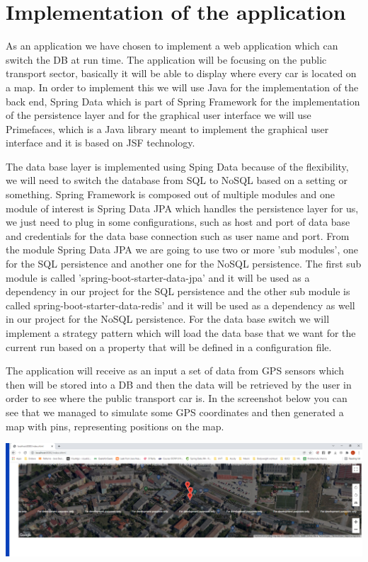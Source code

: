 \chapter{Implementation of the application}\label{sect:implementation}

\tab As an application we have chosen to implement a web application which can switch the DB at run time. The application will be focusing on the public transport sector, basically it will be able to display where every car is located on a map. In order to implement this we will use Java for the implementation of the back end, Spring Data which is part of Spring Framework for the implementation of the persistence layer and for the graphical user interface we will use Primefaces, which is a Java library meant to implement the graphical user interface and it is based on JSF technology.

\tab The data base layer is implemented using Sping Data because of the flexibility, we will need to switch the database from SQL to NoSQL based on a setting or something. Spring Framework is composed out of multiple modules and one module of interest is Spring Data JPA which handles the persistence layer for us, we just need to plug in some configurations, such as host and port of data base and credentials for the data base connection such as user name and port. From the module Spring Data JPA we are going to use two or more 'sub modules', one for the SQL persistence and another one for the NoSQL persistence. The first sub module is called 'spring-boot-starter-data-jpa' and it will be used as a dependency in our project for the SQL persistence and the other sub module is called spring-boot-starter-data-redis' and it will be used as a dependency as well in our project for the NoSQL persistence. For the data base switch we will implement a strategy pattern which will load the data base that we want for the current run based on a property that will be defined in a configuration file.

\tab The application will receive as an input a set of data from GPS sensors which then will be stored into a DB and then the data will be retrieved by the user in order to see where the public transport car is. In the screenshot below you can see that we managed to simulate some GPS coordinates and then generated a map with pins, representing positions on the map.

\begin{center}
\includegraphics[width=400pt]{first screenshot.PNG} 
\end{center}

